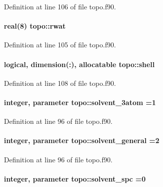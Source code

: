 Definition at line 106 of file topo.\-f90.

\hypertarget{classtopo_a5afc147998793fe81dc80f71d620b250}{
\paragraph[{rwat}]{\setlength{\rightskip}{0pt plus 5cm}real(8) topo\-::rwat}}\label{classtopo_a5afc147998793fe81dc80f71d620b250}


Definition at line 105 of file topo.\-f90.

\hypertarget{classtopo_acb17ff02ccc726e439feaad37738f222}{
\paragraph[{shell}]{\setlength{\rightskip}{0pt plus 5cm}logical, dimension(\-:), allocatable topo\-::shell}}\label{classtopo_acb17ff02ccc726e439feaad37738f222}


Definition at line 108 of file topo.\-f90.

\hypertarget{classtopo_adfbe1f0059a125762d2f0be3ad7899f1}{
\paragraph[{solvent\-\_\-3atom}]{\setlength{\rightskip}{0pt plus 5cm}integer, parameter topo\-::solvent\-\_\-3atom =1}}\label{classtopo_adfbe1f0059a125762d2f0be3ad7899f1}


Definition at line 96 of file topo.\-f90.

\hypertarget{classtopo_ac2cd61b970ce97de005f36f91d23aa29}{
\paragraph[{solvent\-\_\-general}]{\setlength{\rightskip}{0pt plus 5cm}integer, parameter topo\-::solvent\-\_\-general =2}}\label{classtopo_ac2cd61b970ce97de005f36f91d23aa29}


Definition at line 96 of file topo.\-f90.

\hypertarget{classtopo_a511570d6a5e9c6eef152d18f793f51ad}{
\paragraph[{solvent\-\_\-spc}]{\setlength{\rightskip}{0pt plus 5cm}integer, parameter topo\-::solvent\-\_\-spc =0}}\label{classtopo_a511570d6a5e9c6eef152d18f793f51ad}


